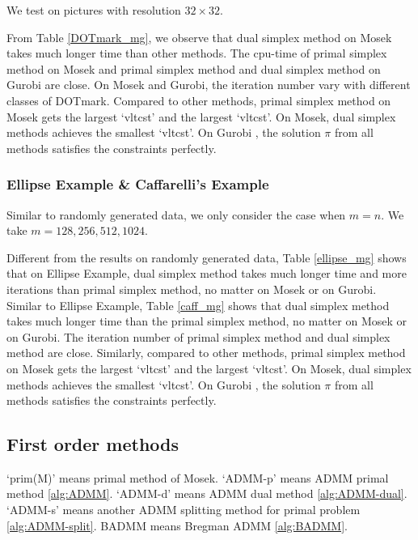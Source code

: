 We test on pictures with resolution $32\times32$. 


From Table \ref{DOTmark_mg}, we observe that dual simplex method on Mosek takes much longer time than other methods. The cpu-time of primal simplex method on Mosek and primal simplex method and dual simplex method on Gurobi are close. On Mosek and Gurobi, the iteration number vary with different classes of DOTmark. Compared to other methods, primal simplex method on Mosek gets the largest `vltcst' and the largest `vltcst'. On Mosek, dual simplex methods achieves the smallest `vltcst'. On Gurobi , the solution $\pi$ from all methods satisfies the constraints perfectly.

\subsubsection{Ellipse Example \& Caffarelli's Example}
Similar to randomly generated data, we only consider the case when $m=n$. We take $m=128,256,512,1024$.  



Different from the results on randomly generated data, Table \ref{ellipse_mg} shows that on Ellipse Example, dual simplex method takes much longer time and more iterations than primal simplex method, no matter on Mosek or on Gurobi. Similar to Ellipse Example, Table \ref{caff_mg} shows that dual simplex method takes much longer time than the primal simplex method, no matter on Mosek or on Gurobi. The iteration number of primal simplex method and dual simplex method are close. Similarly, compared to other methods, primal simplex method on Mosek gets the largest `vltcst' and the largest `vltcst'. On Mosek, dual simplex methods achieves the smallest `vltcst'. On Gurobi , the solution $\pi$ from all methods satisfies the constraints perfectly.

\subsection{First order methods}
`prim(M)' means primal method of Mosek. `ADMM-p' means ADMM primal method \ref{alg:ADMM}. `ADMM-d' means ADMM dual method \ref{alg:ADMM-dual}. `ADMM-s' means another ADMM splitting method for primal problem \ref{alg:ADMM-split}. BADMM means Bregman ADMM \ref{alg:BADMM}.
